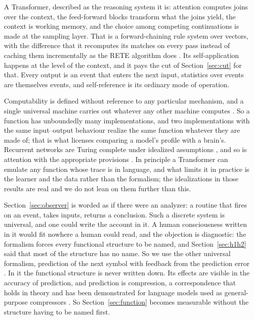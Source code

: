 A Transformer, described as the reasoning system it is: attention computes joins over the context, the
feed-forward blocks transform what the joins yield, the context is working memory, and the choice among
competing continuations is made at the sampling layer. That is a forward-chaining rule system over
vectors, with the difference that it recomputes its matches on every pass instead of caching them
incrementally as the RETE algorithm does \citep{forgy1982}. Its self-application happens at the level
of the context, and it pays the cut of Section~\ref{sec:cut} for that. Every output is an event that
enters the next input, statistics over events are themselves events, and self-reference is its ordinary
mode of operation.

Computability is defined without reference to any particular mechanism, and a single universal machine
carries out whatever any other machine computes \citep[\S 6--7]{turing1936}. So a function has
unboundedly many implementations, and two implementations with the same input--output behaviour realize
the same function whatever they are made of; that is what licenses comparing a model's profile with a
brain's. Recurrent networks are Turing complete under idealized assumptions \citep{siegelmann1995},
and so is attention with the appropriate provisions \citep{perez2021}. In principle a Transformer can
emulate any function whose trace is in language, and what limits it in practice is the learner and the
data rather than the formalism; the idealizations in those results are real and we do not lean on them
further than this.

Section~\ref{sec:observer} is worded as if there were an analyzer: a routine that fires on an event,
takes inputs, returns a conclusion. Such a discrete system is universal, and one could write the account
in it. A human consciousness written in it would fit nowhere a human could read, and the objection is
diagnostic: the formalism forces every functional structure to be named, and Section~\ref{sec:h1h2}
said that most of the structure has no name. So we use the other universal formalism, prediction of the
next symbol with feedback from the prediction error \citep{solomonoff1964a}. In it the functional
structure is never written down. Its effects are visible in the accuracy of prediction, and prediction
is compression, a correspondence that holds in theory and has been demonstrated for language models
used as general-purpose compressors \citep{deletang2024}. So Section~\ref{sec:function} becomes
measurable without the structure having to be named first.

